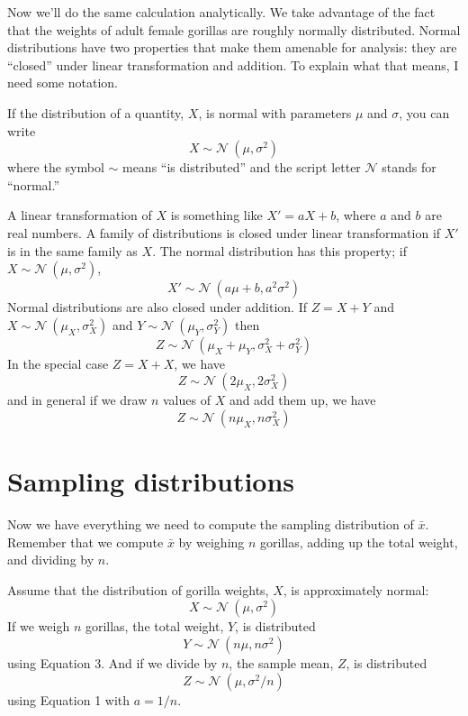 \documentclass[12pt]{book}
\newcommand{\xbar}{\bar{x}}
\newcommand{\normal}{\mathcal{N}}
\theoremstyle{exercise}
\begin{document}
Now we'll do the same calculation analytically.  We
take advantage of the fact that the weights of adult female gorillas
are roughly normally distributed.  Normal distributions have two
properties that make them amenable for analysis: they are ``closed'' under
linear transformation and addition.  To explain what that means, I
need some notation.%
%
%

If the distribution of a quantity, $X$, is
normal with parameters $\mu$ and $\sigma$, you can write
%
\[ X \sim \normal~(\mu, \sigma^{2})\]
%
where the symbol $\sim$ means ``is distributed'' and the script letter
$\normal$ stands for ``normal.''


A linear transformation of $X$ is something like $X' = a X + b$, where
$a$ and $b$ are real numbers.
A family of distributions is closed under
linear transformation if $X'$ is in the same family as $X$.  The normal
distribution has this property; if $X \sim \normal~(\mu,
\sigma^2)$,
%
\[ X' \sim \normal~(a \mu + b, a^{2} \sigma^2) \tag*{(1)} \]
%
Normal distributions are also closed under addition.  
If $Z = X + Y$ and
$X \sim \normal~(\mu_{X}, \sigma_{X}^{2})$ and
$Y \sim \normal~(\mu_{Y}, \sigma_{Y}^{2})$ then
%
\[ Z \sim \normal~(\mu_X + \mu_Y, \sigma_X^2 + \sigma_Y^2)  \tag*{(2)}\]
%
In the special case $Z = X + X$, we have
%
\[ Z \sim \normal~(2 \mu_X, 2 \sigma_X^2) \]
%
and in general if we draw $n$ values of $X$ and add them up, we have
%
\[ Z \sim \normal~(n \mu_X, n \sigma_X^2)  \tag*{(3)}\]


\section{Sampling distributions}

Now we have everything we need to compute the sampling distribution of
$\xbar$.  Remember that we compute $\xbar$ by weighing $n$ gorillas,
adding up the total weight, and dividing by $n$.%
%
%

Assume that the distribution of gorilla weights, $X$, is
approximately normal:
%
\[ X \sim \normal~(\mu, \sigma^2)\]
%
If we weigh $n$ gorillas, the total weight, $Y$, is distributed
%
\[ Y \sim \normal~(n \mu, n \sigma^2) \]
%
using Equation 3.  And if we divide by $n$, the sample mean,
$Z$, is distributed
%
\[ Z \sim \normal~(\mu, \sigma^2/n) \]
%
using Equation 1 with $a = 1/n$.
\end{document}

